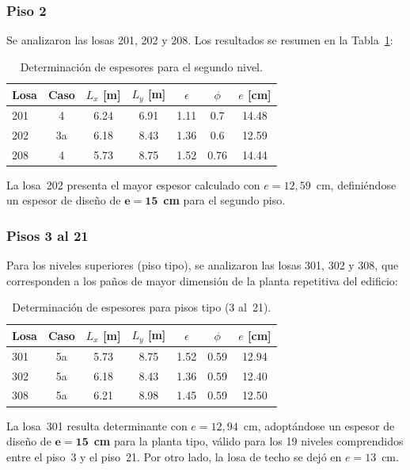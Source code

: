 \subsubsection{Piso 2}

Se analizaron las losas 201, 202 y 208. Los resultados se resumen en la 
Tabla~\ref{tab:esp_piso2}:

\begin{table}[H]
    \centering
    \begin{tabular}{lcccccc}
        \toprule
        \textbf{Losa} & \textbf{Caso} & $L_x$ [m] & $L_y$ [m] & 
        $\epsilon$ & $\phi$ & $e$ [cm] \\
        \midrule
        201 & 4 & 6.24 & 6.91 & 1.11 & 0.7 & 14.48 \\
        202 & 3a & 6.18 & 8.43 & 1.36 & 0.6 & 12.59 \\
        208 & 4 & 5.73 & 8.75 & 1.52 & 0.76 & 14.44 \\
        \bottomrule
    \end{tabular}
    \caption{Determinación de espesores para el segundo nivel.}
    \label{tab:esp_piso2}
\end{table}

La losa~202 presenta el mayor espesor calculado con $e = 12{,}59$~cm, 
definiéndose un espesor de diseño de $\mathbf{e = 15}$~\textbf{cm} para 
el segundo piso.

\subsubsection{Pisos 3 al 21}

Para los niveles superiores (piso tipo), se analizaron las losas 301, 302 
y 308, que corresponden a los paños de mayor dimensión de la planta 
repetitiva del edificio:

\begin{table}[H]
    \centering
    \begin{tabular}{lcccccc}
        \toprule
        \textbf{Losa} & \textbf{Caso} & $L_x$ [m] & $L_y$ [m] & 
        $\epsilon$ & $\phi$ & $e$ [cm] \\
        \midrule
        301 & 5a & 5.73 & 8.75 & 1.52 & 0.59 & 12.94 \\
        302 & 5a & 6.18 & 8.43 & 1.36 & 0.59 & 12.40 \\
        308 & 5a & 6.21 & 8.98 & 1.45 & 0.59 & 12.50 \\
        \bottomrule
    \end{tabular}
    \caption{Determinación de espesores para pisos tipo (3 al~21).}
    \label{tab:esp_pisotipo}
\end{table}

La losa~301 resulta determinante con $e = 12{,}94$~cm, adoptándose un espesor 
de diseño de $\mathbf{e = 15}$~\textbf{cm} para la planta tipo, válido para 
los 19 niveles comprendidos entre el piso~3 y el piso~21. Por otro lado, la losa de techo se dejó en $e=13$~cm.